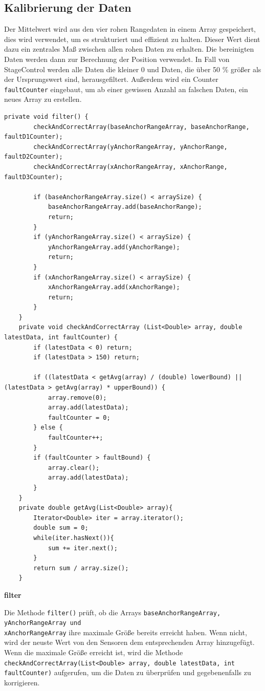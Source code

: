 \subsection{Kalibrierung der Daten}
\label{KalibrierungDerDaten}
Der Mittelwert wird aus den vier rohen Rangedaten in einem Array gespeichert, dies wird verwendet, um es strukturiert und effizient zu halten. Dieser Wert dient dazu ein zentrales Maß zwischen allen rohen Daten zu erhalten. Die bereinigten Daten werden dann zur Berechnung der Position verwendet. In Fall von StageControl werden alle Daten die kleiner 0 und Daten, die über 50 \% größer als der Ursprungswert sind, herausgefiltert. Außerdem wird ein Counter \texttt{faultCounter} eingebaut, um ab einer gewissen Anzahl an falschen Daten, ein neues Array zu erstellen. 
\newpage
\begin{lstlisting}[style=Java, caption=Kalibrierung der Daten, captionpos=b]
	private void filter() {
		checkAndCorrectArray(baseAnchorRangeArray, baseAnchorRange, faultD1Counter);
		checkAndCorrectArray(yAnchorRangeArray, yAnchorRange, faultD2Counter);
		checkAndCorrectArray(xAnchorRangeArray, xAnchorRange, faultD3Counter);
		
		if (baseAnchorRangeArray.size() < arraySize) {
			baseAnchorRangeArray.add(baseAnchorRange);
			return;
		}
		if (yAnchorRangeArray.size() < arraySize) {
			yAnchorRangeArray.add(yAnchorRange);
			return;
		}
		if (xAnchorRangeArray.size() < arraySize) {
			xAnchorRangeArray.add(xAnchorRange);
			return;
		}
	}
	private void checkAndCorrectArray (List<Double> array, double latestData, int faultCounter) {
		if (latestData < 0) return;
		if (latestData > 150) return;
		
		if ((latestData < getAvg(array) / (double) lowerBound) || (latestData > getAvg(array) * upperBound)) {
			array.remove(0);
			array.add(latestData);
			faultCounter = 0;
		} else {
			faultCounter++;
		}
		if (faultCounter > faultBound) {
			array.clear();
			array.add(latestData);
		}
	}
	private double getAvg(List<Double> array){
		Iterator<Double> iter = array.iterator();
		double sum = 0;
		while(iter.hasNext()){
			sum += iter.next();
		}
		return sum / array.size();
	}
\end{lstlisting}

\textbf{filter}

Die Methode \texttt{filter()} prüft, ob die Arrays \texttt{baseAnchorRangeArray, yAnchorRangeArray und \\ xAnchorRangeArray} ihre maximale Größe bereits erreicht haben. Wenn nicht, wird der neuste Wert von den Sensoren dem entsprechenden Array hinzugefügt. Wenn die maximale Größe erreicht ist, wird die Methode \\ \texttt{checkAndCorrectArray(List<Double> array, double latestData, int faultCounter)} aufgerufen, um die Daten zu überprüfen und gegebenenfalls zu korrigieren.

